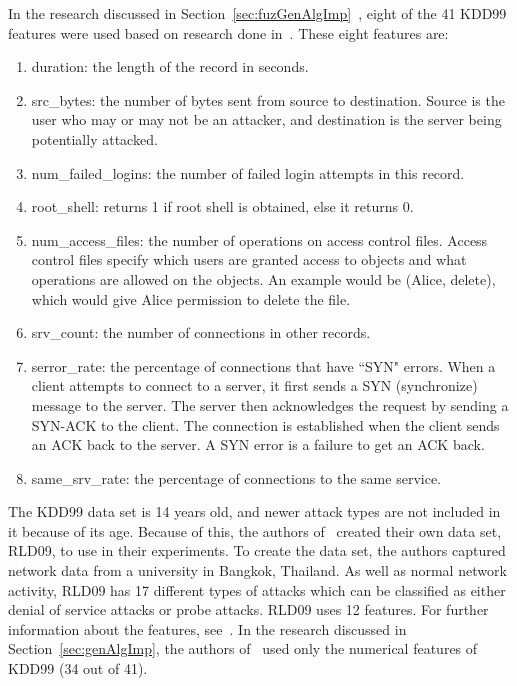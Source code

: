 \documentclass{sig-alternate}
\begin{document}
In the research discussed in Section~\ref{sec:fuzGenAlgImp}~\cite{6496342, 6559603}, eight of the 41 KDD99 features were used based on research done in~\cite{Fries:2008:FAN:1388969.1389037}. These eight features are:
\begin{enumerate}
\setlength{\itemsep}{1pt}
  \item duration: the length of the record in seconds.
  \item src\_bytes: the number of bytes sent from source to destination. Source is the user who may or may not be an attacker, and destination is the server being potentially attacked.
  \item num\_failed\_logins: the number of failed login attempts in this record.
  \item root\_shell: returns 1 if root shell is obtained, else it returns 0.
  \item num\_access\_files: the number of operations on access control files. Access control files specify which users are granted access to objects and what operations are allowed on the objects. An example would be (Alice, delete), which would give Alice permission to delete the file.~\cite{accessControl}
  \item srv\_count: the number of connections in other records.
  \item serror\_rate: the percentage of connections that have ``SYN" errors. When a client attempts to connect to a server, it first sends a SYN (synchronize) message to the server. The server then acknowledges the request by sending a SYN-ACK to the client. The connection is established when the client sends an ACK back to the server. A SYN error is a failure to get an ACK back.~\cite{TCP}
  \item same\_srv\_rate: the percentage of connections to the same service.
\end{enumerate}

The KDD99 data set is 14 years old, and newer attack types are not included in it because of its age. Because of this, the authors of~\cite{6496342, 6559603} created their own data set, RLD09, to use in their experiments. To create the data set, the authors captured network data from a university in Bangkok, Thailand. As well as normal network activity, RLD09 has 17 different types of attacks which can be classified as either denial of service attacks or probe attacks. RLD09 uses 12 features. For further information about the features, see~\cite{6496342}. In the research discussed in Section~\ref{sec:genAlgImp}, the authors of~\cite{DBLP:journals/corr/abs-1204-1336} used only the numerical features of KDD99 (34 out of 41).
\end{document}
